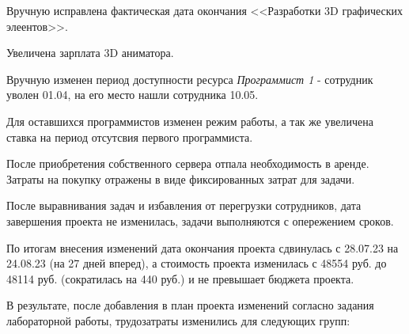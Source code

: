 
Вручную исправлена фактическая дата окончания <<Разработки 3D графических элеентов>>.


Увеличена зарплата 3D аниматора.


\clearpage

Вручную изменен период доступности ресурса \textit{Программист 1} - сотрудник уволен 01.04, на его место нашли сотрудника 10.05. 


Для оставшихся программистов изменен режим работы, а так же увеличена ставка на период отсутсвия первого программиста.


\clearpage



\clearpage

После приобретения собственного сервера отпала необходимость в аренде. Затраты на покупку отражены в виде фиксированных затрат для задачи.


После выравнивания задач и избавления от перегрузки сотрудников, дата завершения проекта не изменилась, задачи выполняются с опережением сроков.


По итогам внесения изменений дата окончания проекта сдвинулась с 28.07.23 на 24.08.23 (на 27 дней вперед), а стоимость проекта изменилась с 48554 руб. до 48114 руб. (сократилась на 440 руб.) и не превышает бюджета проекта.

В результате, после добавления в план проекта изменений согласно задания лабораторной работы, трудозатраты изменились для следующих групп:

